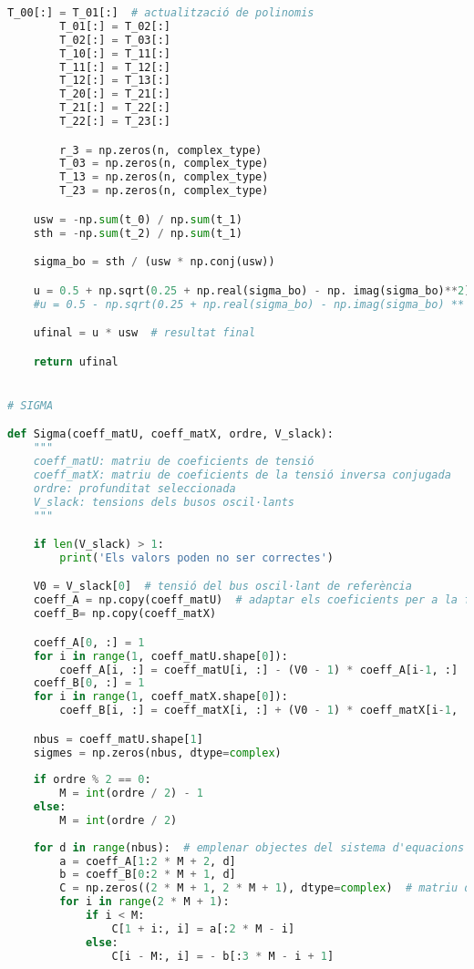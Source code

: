 \begin{lstlisting}[language=Python,numbers=none]
        T_00[:] = T_01[:]  # actualització de polinomis
        T_01[:] = T_02[:]
        T_02[:] = T_03[:]
        T_10[:] = T_11[:]
        T_11[:] = T_12[:]
        T_12[:] = T_13[:]
        T_20[:] = T_21[:]
        T_21[:] = T_22[:]
        T_22[:] = T_23[:]

        r_3 = np.zeros(n, complex_type)
        T_03 = np.zeros(n, complex_type)
        T_13 = np.zeros(n, complex_type)
        T_23 = np.zeros(n, complex_type)

    usw = -np.sum(t_0) / np.sum(t_1)
    sth = -np.sum(t_2) / np.sum(t_1)

    sigma_bo = sth / (usw * np.conj(usw))

    u = 0.5 + np.sqrt(0.25 + np.real(sigma_bo) - np. imag(sigma_bo)**2) + np.imag(sigma_bo)*1j  # branca estable
    #u = 0.5 - np.sqrt(0.25 + np.real(sigma_bo) - np.imag(sigma_bo) ** 2) + np.imag(sigma_bo) * 1j  # branca inestable

    ufinal = u * usw  # resultat final

    return ufinal


# SIGMA    

def Sigma(coeff_matU, coeff_matX, ordre, V_slack):
    """
    coeff_matU: matriu de coeficients de tensió
    coeff_matX: matriu de coeficients de la tensió inversa conjugada
    ordre: profunditat seleccionada
    V_slack: tensions dels busos oscil·lants
    """

    if len(V_slack) > 1:
        print('Els valors poden no ser correctes')

    V0 = V_slack[0]  # tensió del bus oscil·lant de referència
    coeff_A = np.copy(coeff_matU)  # adaptar els coeficients per a la funció racional
    coeff_B= np.copy(coeff_matX)

    coeff_A[0, :] = 1
    for i in range(1, coeff_matU.shape[0]):
        coeff_A[i, :] = coeff_matU[i, :] - (V0 - 1) * coeff_A[i-1, :]
    coeff_B[0, :] = 1
    for i in range(1, coeff_matX.shape[0]):
        coeff_B[i, :] = coeff_matX[i, :] + (V0 - 1) * coeff_matX[i-1, :]

    nbus = coeff_matU.shape[1]
    sigmes = np.zeros(nbus, dtype=complex)
    
    if ordre % 2 == 0:
        M = int(ordre / 2) - 1
    else:
        M = int(ordre / 2)
        
    for d in range(nbus):  # emplenar objectes del sistema d'equacions
        a = coeff_A[1:2 * M + 2, d]
        b = coeff_B[0:2 * M + 1, d]
        C = np.zeros((2 * M + 1, 2 * M + 1), dtype=complex)  # matriu del sistema
        for i in range(2 * M + 1):
            if i < M:
                C[1 + i:, i] = a[:2 * M - i]
            else:
                C[i - M:, i] = - b[:3 * M - i + 1]
                

\end{lstlisting}
